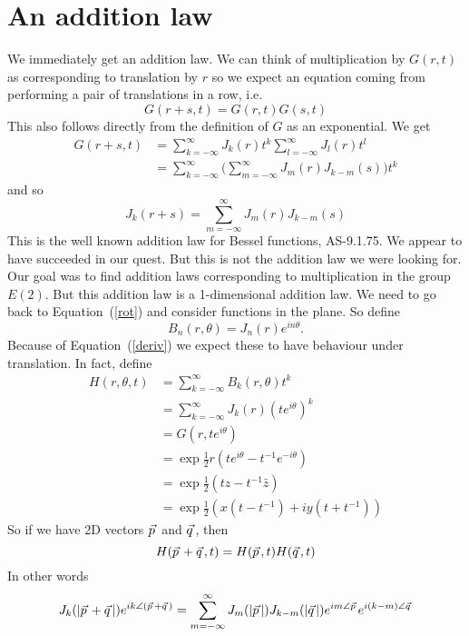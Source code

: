 \documentclass{article}
\newcommand\myvec[1]{\vec{#1}\hspace{0.5mm}}
\begin{document}
\section{An addition law}
We immediately get an addition law.
We can think of multiplication by $G(r,t)$ as corresponding to translation by $r$ so we expect an equation coming from performing a pair of translations in a row, i.e.
\[
G(r+s,t) = G(r,t)G(s,t)
\]
This also follows directly from the definition of $G$ as an exponential.
We get
\begin{align*}
G(r+s,t) &= \sum_{k=-\infty}^\infty J_k(r)t^k\sum_{l=-\infty}^\infty J_l(r)t^l\\
&= \sum_{k=-\infty}^\infty \Big(\sum_{m=-\infty}^\infty J_{m}(r)J_{k-m}(s) \Big) t^k
\end{align*}
and so
\[
J_k(r+s) = \sum_{m=-\infty}^\infty J_{m}(r)J_{k-m}(s)
\]
This is the well known addition law for Bessel functions, AS-9.1.75.
We appear to have succeeded in our quest.
But this is not the addition law we were looking for.
Our goal was to find addition laws corresponding to multiplication in the group $E(2)$.
But this addition law is a 1-dimensional addition law.
We need to go back to Equation~(\ref{rot}) and consider functions in the plane.
So define
\[
B_n(r,\theta) = J_n(r)e^{in\theta}.
\]
Because of Equation~(\ref{deriv}) we expect these to have behaviour under translation.
In fact, define
\begin{align*}
H(r,\theta,t) &= \sum_{k=-\infty}^\infty B_k(r,\theta)t^k \\
&= \sum_{k=-\infty}^\infty J_k(r)(te^{i\theta})^k \\
&= G(r,te^{i\theta}) \\
&= \exp\frac{1}{2}r(te^{i\theta}-t^{-1}e^{-i\theta}) \\
&= \exp\frac{1}{2}(tz-t^{-1}\bar{z}) \\
&= \exp\frac{1}{2}(x(t-t^{-1})+iy(t+t^{-1}))
\end{align*}
So if we have 2D vectors $\myvec{p}$ and $\myvec{q}$, then
\[
H(\myvec{p}+\myvec{q},t) = H(\myvec{p},t)H(\myvec{q},t)
\]
In other words
\[
J_k(|\myvec{p}+\myvec{q}|)e^{ik\angle(\myvec{p}+\myvec{q})} = \sum_{m=-\infty}^\infty J_m(|\myvec{p}|)J_{k-m}(|\myvec{q}|)e^{im\angle\myvec{p}}e^{i(k-m)\angle\myvec{q}}
\]


\begin{figure}
\centering
{}
\end{figure}
\end{document}
